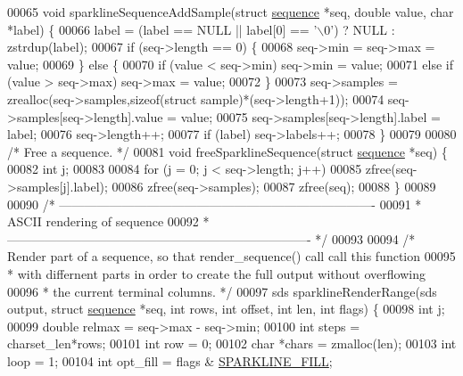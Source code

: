 \begin{DoxyCode}
00065 \textcolor{keywordtype}{void} sparklineSequenceAddSample(\textcolor{keyword}{struct} \hyperlink{structsequence}{sequence} *seq, \textcolor{keywordtype}{double} value, \textcolor{keywordtype}{char} *label) \{
00066     label = (label == NULL || label[0] == \textcolor{stringliteral}{'\(\backslash\)0'}) ? NULL : zstrdup(label);
00067     \textcolor{keywordflow}{if} (seq->length == 0) \{
00068         seq->min = seq->max = value;
00069     \} \textcolor{keywordflow}{else} \{
00070         \textcolor{keywordflow}{if} (value < seq->min) seq->min = value;
00071         \textcolor{keywordflow}{else} \textcolor{keywordflow}{if} (value > seq->max) seq->max = value;
00072     \}
00073     seq->samples = zrealloc(seq->samples,\textcolor{keyword}{sizeof}(\textcolor{keyword}{struct} sample)*(seq->length+1));
00074     seq->samples[seq->length].value = value;
00075     seq->samples[seq->length].label = label;
00076     seq->length++;
00077     \textcolor{keywordflow}{if} (label) seq->labels++;
00078 \}
00079 
00080 \textcolor{comment}{/* Free a sequence. */}
00081 \textcolor{keywordtype}{void} freeSparklineSequence(\textcolor{keyword}{struct} \hyperlink{structsequence}{sequence} *seq) \{
00082     \textcolor{keywordtype}{int} j;
00083 
00084     \textcolor{keywordflow}{for} (j = 0; j < seq->length; j++)
00085         zfree(seq->samples[j].label);
00086     zfree(seq->samples);
00087     zfree(seq);
00088 \}
00089 
00090 \textcolor{comment}{/* ----------------------------------------------------------------------------}
00091 \textcolor{comment}{ * ASCII rendering of sequence}
00092 \textcolor{comment}{ * ------------------------------------------------------------------------- */}
00093 
00094 \textcolor{comment}{/* Render part of a sequence, so that render\_sequence() call call this function}
00095 \textcolor{comment}{ * with differnent parts in order to create the full output without overflowing}
00096 \textcolor{comment}{ * the current terminal columns. */}
00097 sds sparklineRenderRange(sds output, \textcolor{keyword}{struct} \hyperlink{structsequence}{sequence} *seq, \textcolor{keywordtype}{int} rows, \textcolor{keywordtype}{int} offset, \textcolor{keywordtype}{int} len, \textcolor{keywordtype}{int} 
      flags) \{
00098     \textcolor{keywordtype}{int} j;
00099     \textcolor{keywordtype}{double} relmax = seq->max - seq->min;
00100     \textcolor{keywordtype}{int} steps = charset\_len*rows;
00101     \textcolor{keywordtype}{int} row = 0;
00102     \textcolor{keywordtype}{char} *chars = zmalloc(len);
00103     \textcolor{keywordtype}{int} loop = 1;
00104     \textcolor{keywordtype}{int} opt\_fill = flags & \hyperlink{sparkline_8h_af6a091d13a723f2ac2a848be4235a6cd}{SPARKLINE\_FILL};

\end{DoxyCode}
